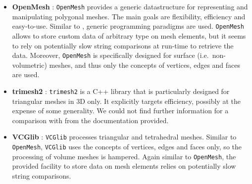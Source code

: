 \begin{itemize}
  \item \textbf{OpenMesh} \cite{OpenMesh}: \texttt{OpenMesh} provides a generic datastructure for representing and manipulating polygonal meshes. The main goals are flexibility, efficiency and easy-to-use. Similar to {\ViennaGrid}, generic programming paradigms are used. \texttt{OpenMesh} allows to store custom data of arbitrary type on mesh elements, but it seems to rely on potentially slow string comparisons at run-time to retrieve the data. Moreover, \texttt{OpenMesh} is specifically designed for surface (i.e.~non-volumetric) meshes, and thus only the concepts of vertices, edges and faces are used.

  \item \textbf{trimesh2} \cite{trimesh2}: \texttt{trimesh2} is a C++ library that is particularly designed for triangular meshes in 3D only. It explicitly targets efficiency, possibly at the expense of some generality. We could not find further information for a comparison with {\ViennaGrid} from the documentation provided.

  \item \textbf{VCGlib} \cite{VCGlib}: \texttt{VCGlib} processes triangular and tetrahedral meshes. Similar to \texttt{OpenMesh}, \texttt{VCGlib} uses the concepts of vertices, edges and faces only, so the processing of volume meshes is hampered. Again similar to \texttt{OpenMesh}, the provided facility to store data on mesh elements relies on potentially slow string comparisons.
\end{itemize}




